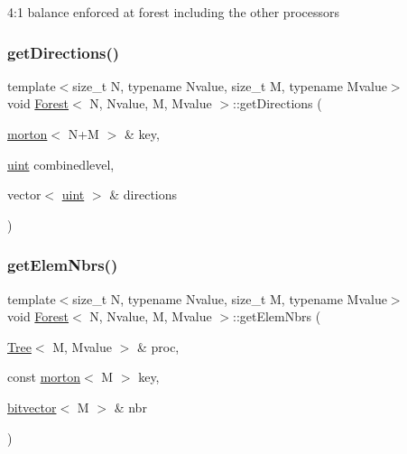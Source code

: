 4\+:1 balance enforced at forest including the other processors \mbox{\label{classForest_aee0e0c05b2106c24a7327d263e178da0}} 
\subsubsection{\texorpdfstring{get\+Directions()}{getDirections()}}
{\footnotesize\ttfamily template$<$size\+\_\+t N, typename Nvalue, size\+\_\+t M, typename Mvalue$>$ \\
void \mbox{\hyperlink{classForest}{Forest}}$<$ N, Nvalue, M, Mvalue $>$\+::get\+Directions (\begin{DoxyParamCaption}\item[{\mbox{\hyperlink{definitions_8h_af8682350bd8bb38ee9023f7a0a310add}{morton}}$<$ N+M $>$ \&}]{key,  }\item[{\mbox{\hyperlink{definitions_8h_a69aa29b598b851b0640aa225a9e5d61d}{uint}}}]{combinedlevel,  }\item[{vector$<$ \mbox{\hyperlink{definitions_8h_a69aa29b598b851b0640aa225a9e5d61d}{uint}} $>$ \&}]{directions }\end{DoxyParamCaption})}

\mbox{\label{classForest_af5a501fbaa0a516f722f8c896f00ed6b}} 
\subsubsection{\texorpdfstring{get\+Elem\+Nbrs()}{getElemNbrs()}}
{\footnotesize\ttfamily template$<$size\+\_\+t N, typename Nvalue, size\+\_\+t M, typename Mvalue$>$ \\
void \mbox{\hyperlink{classForest}{Forest}}$<$ N, Nvalue, M, Mvalue $>$\+::get\+Elem\+Nbrs (\begin{DoxyParamCaption}\item[{\mbox{\hyperlink{classTree}{Tree}}$<$ M, Mvalue $>$ \&}]{proc,  }\item[{const \mbox{\hyperlink{definitions_8h_af8682350bd8bb38ee9023f7a0a310add}{morton}}$<$ M $>$}]{key,  }\item[{\mbox{\hyperlink{definitions_8h_a55821d7929f3f16aaf1466129c209492}{bitvector}}$<$ M $>$ \&}]{nbr }\end{DoxyParamCaption})}

